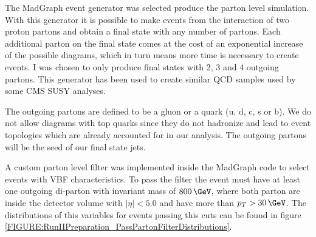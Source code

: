 
The MadGraph event generator was selected produce the parton level simulation. With this generator it is possible to make events from the interaction of two proton partons and obtain a final state with any number of partons. Each additional parton on the final state comes at the cost of an exponential increase of the possible diagrams, which in turn means more time is necessary to create events. I was chosen to only produce final states with 2, 3 and 4 outgoing partons. This generator has been used to create similar \gls{QCD} samples used by some \gls{CMS} \gls{SUSY} analyses. 

The outgoing partons are defined to be a gluon or a quark (u, d, c, s or b). We do not allow diagrams with top quarks since they do not hadronize and lead to event topologies which are already accounted for in our analysis. The outgoing partons will be the seed of our final state jets. 

A custom parton level filter was implemented inside the MadGraph code to select events with \gls{VBF} characteristics. To pass the filter the event must have at least one outgoing di-parton with invariant mass of $800\,\GeV$, where both parton are inside the detector volume with $|\eta|<5.0$ and have more than $p_{T}>30\,\GeV$. The distributions of this variables for events passing this cuts can be found in figure \ref{FIGURE:RunIIPreparation_PassPartonFilterDistributions}.

